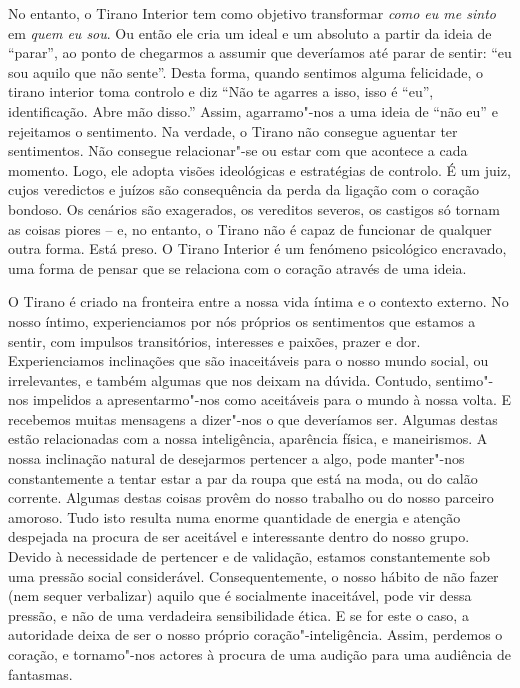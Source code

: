 \sectionBreak

No entanto, o Tirano Interior tem como objetivo transformar \emph{como
eu me sinto} em \emph{quem eu sou}. Ou então ele cria um ideal e um
absoluto a partir da ideia de “parar”, ao ponto de chegarmos a assumir
que deveríamos até parar de sentir: “eu sou aquilo que não sente”. Desta
forma, quando sentimos alguma felicidade, o tirano interior toma
controlo e diz “Não te agarres a isso, isso é “eu”, identificação. Abre
mão disso.” Assim, agarramo"-nos a uma ideia de “não eu” e rejeitamos o
sentimento. Na verdade, o Tirano não consegue aguentar ter sentimentos.
Não consegue relacionar"-se ou estar com que acontece a cada momento.
Logo, ele adopta visões ideológicas e estratégias de controlo. É um
juiz, cujos veredictos e juízos são consequência da perda da ligação com
o coração bondoso. Os cenários são exagerados, os vereditos severos, os
castigos só tornam as coisas piores -- e, no entanto, o Tirano não é
capaz de funcionar de qualquer outra forma. Está preso. O Tirano
Interior é um fenómeno psicológico encravado, uma forma de pensar que se
relaciona com o coração através de uma ideia.

O Tirano é criado na fronteira entre a nossa vida íntima e o contexto
externo. No nosso íntimo, experienciamos por nós próprios os sentimentos
que estamos a sentir, com impulsos transitórios, interesses e paixões,
prazer e dor. Experienciamos inclinações que são inaceitáveis para o
nosso mundo social, ou irrelevantes, e também algumas que nos deixam na
dúvida. Contudo, sentimo"-nos impelidos a apresentarmo"-nos como
aceitáveis para o mundo à nossa volta. E recebemos muitas mensagens a
dizer"-nos o que deveríamos ser. Algumas destas estão relacionadas com a
nossa inteligência, aparência física, e maneirismos. A nossa inclinação
natural de desejarmos pertencer a algo, pode manter"-nos constantemente a
tentar estar a par da roupa que está na moda, ou do calão corrente.
Algumas destas coisas provêm do nosso trabalho ou do nosso parceiro
amoroso. Tudo isto resulta numa enorme quantidade de energia e atenção
despejada na procura de ser aceitável e interessante dentro do nosso
grupo. Devido à necessidade de pertencer e de validação, estamos
constantemente sob uma pressão social considerável. Consequentemente, o
nosso hábito de não fazer (nem sequer verbalizar) aquilo que é
socialmente inaceitável, pode vir dessa pressão, e não de uma verdadeira
sensibilidade ética. E se for este o caso, a autoridade deixa de ser o
nosso próprio coração"-inteligência. Assim, perdemos o coração, e
tornamo"-nos actores à procura de uma audição para uma audiência de
fantasmas.

